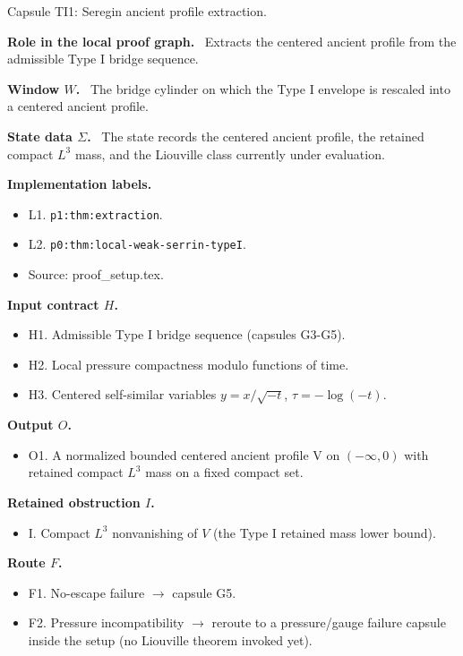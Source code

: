 \documentclass[11pt]{amsart}
\newcommand{\capsulefield}[1]{\par\smallskip\noindent\textbf{#1.}\ }
\begin{document}
\begin{proofcapsule}{Capsule TI1: Seregin ancient profile extraction.}
  \capsulefield{Role in the local proof graph}
  Extracts the centered ancient profile from the admissible Type I bridge sequence.

  \capsulefield{Window \(W\)}
The bridge cylinder on which the Type I envelope is rescaled into a centered ancient profile.

  \capsulefield{State data \(\Sigma\)}
The state records the centered ancient profile, the retained compact $L^3$ mass, and the Liouville class currently under evaluation.

  \capsulefield{Implementation labels}
  \begin{itemize}[leftmargin=1.8em]
  \item L1. \texttt{p1:thm:extraction}.
  \item L2. \texttt{p0:thm:local-weak-serrin-typeI}.
  \item Source: proof\_setup.tex.
  \end{itemize}

  \capsulefield{Input contract \(H\)}
  \begin{itemize}[leftmargin=1.8em]
  \item H1. Admissible Type I bridge sequence (capsules G3-G5).
  \item H2. Local pressure compactness modulo functions of time.
  \item H3. Centered self-similar variables \(y=x/\sqrt{-t}\), \(\tau=-\log(-t)\).
  \end{itemize}

  \capsulefield{Output \(O\)}
  \begin{itemize}[leftmargin=1.8em]
  \item O1. A normalized bounded centered ancient profile V on $(-\infty,0)$ with retained compact $L^3$ mass on a fixed compact set.
  \end{itemize}

  \capsulefield{Retained obstruction \(I\)}
  \begin{itemize}[leftmargin=1.8em]
  \item I. Compact \(L^3\) nonvanishing of \(V\) (the Type I retained mass lower bound).
  \end{itemize}

  \capsulefield{Route \(F\)}
  \begin{itemize}[leftmargin=1.8em]
  \item F1. No-escape failure $\to$ capsule G5.
  \item F2. Pressure incompatibility $\to$ reroute to a pressure/gauge failure capsule inside the setup (no Liouville theorem invoked yet).
  \end{itemize}


\end{proofcapsule}
\end{document}
